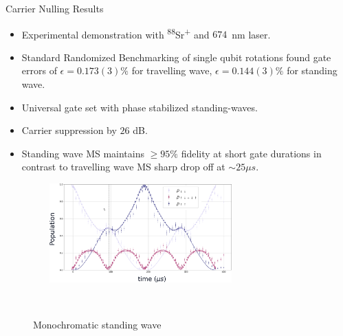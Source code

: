 \documentclass[final]{beamer}
\begin{document}
\begin{frame}{}
\begin{center}
\begin{columns}[t]
\begin{column}{0.49\textwidth}
  \end{column}
  \begin{column}{0.49\textwidth}
    \begin{alertblock}{Carrier Nulling Results}
      \begin{minipage}{0.6\linewidth}
      \begin{itemize}
        \item Experimental demonstration with \textsuperscript{88}Sr\textsuperscript{+} and $674$~nm laser.
        \item Standard Randomized Benchmarking of single qubit
          rotations found gate errors of $\epsilon = 0.173(3)\%$ for
          travelling wave, $\epsilon = 0.144(3)\%$ for standing
          wave.
        \item Universal gate set with phase stabilized standing-waves.
        \item Carrier suppression by $26$ dB.
        \item Standing wave MS maintains $\geq 95\%$ fidelity at short gate durations in contrast to travelling wave MS sharp drop off at $\sim 25\mu s$.\\
      \begin{figure}
        \includegraphics[width=0.7\textwidth]{./figs/temp_gate_profile.png}
      \end{figure}
      \end{itemize}
      \end{minipage}
      ~~~~
      \begin{minipage}{0.34\linewidth}
      \begin{figure}
        Monochromatic standing wave
\end{figure}
\end{minipage}
\end{alertblock}
\end{column}
\end{columns}
\end{center}
\end{frame}
\end{document}
